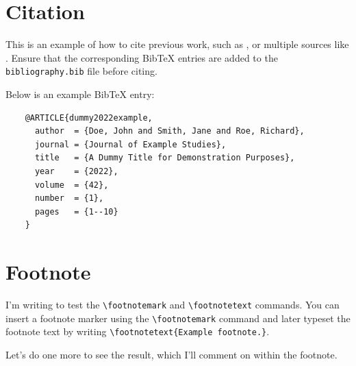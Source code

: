 \section{Citation}
\begin{paragraph}
This is an example of how to cite previous work, such as \cite{min2net}, or multiple sources like \cite{hu79, somework2020, tonio_paper}. Ensure that the corresponding BibTeX entries are added to the \texttt{bibliography.bib} file before citing.

Below is an example BibTeX entry:
\begin{verbatim}
    @ARTICLE{dummy2022example,
      author  = {Doe, John and Smith, Jane and Roe, Richard},
      journal = {Journal of Example Studies}, 
      title   = {A Dummy Title for Demonstration Purposes}, 
      year    = {2022},
      volume  = {42},
      number  = {1},
      pages   = {1--10}
    }
\end{verbatim}
\end{paragraph}

\section{Footnote}
\begin{paragraph}
I'm writing to test the \verb|\footnotemark| and \verb|\footnotetext| commands. 
You can insert a footnote marker using the \verb|\footnotemark|\footnotemark{} command and later typeset the footnote text by writing 
\verb|\footnotetext{Example footnote.}|. 

Let's do one more to see the result\footnotemark{}, which I'll comment on within the footnote.
\end{paragraph}
